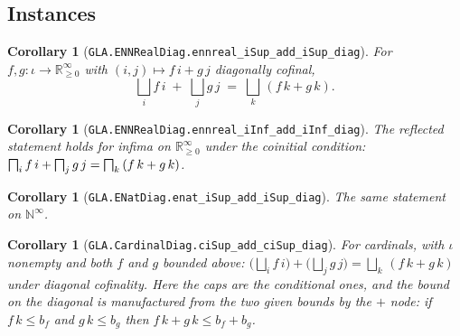 \documentclass[11pt,a4paper]{article}
\providecommand{\bigsqcap}{}
\renewcommand{\bigsqcap}{\mathop{\rotatebox[origin=c]{180}{$\bigsqcup$}}}
\newcommand{\lean}[1]{\texttt{\small #1}}
\newcommand{\Rzi}{\mathbb{R}_{\geq 0}^{\infty}}
\newcommand{\Ninf}{\mathbb{N}^{\infty}}
\theoremstyle{definition}
\theoremstyle{plain}
\newtheorem{corollary}[definition]{Corollary}
\theoremstyle{remark}
\begin{document}
\subsection{Instances}

\begin{corollary}[\lean{GLA.ENNRealDiag.ennreal\_iSup\_add\_iSup\_diag}]
For $f,g:\iota\to\Rzi$ with $(i,j)\mapsto f\,i+g\,j$ diagonally cofinal,
\[
\bigsqcup_i f\,i \;+\; \bigsqcup_j g\,j \;=\; \bigsqcup_k\,(f\,k+g\,k).
\]
\end{corollary}

\begin{corollary}[\lean{GLA.ENNRealDiag.ennreal\_iInf\_add\_iInf\_diag}]
The reflected statement holds for infima on $\Rzi$ under the coinitial
condition:
$\bigsqcap_i f\,i+\bigsqcap_j g\,j=\bigsqcap_k\,(f\,k+g\,k)$.
\end{corollary}

\begin{corollary}[\lean{GLA.ENatDiag.enat\_iSup\_add\_iSup\_diag}]
The same statement on $\Ninf$.
\end{corollary}

\begin{corollary}[\lean{GLA.CardinalDiag.ciSup\_add\_ciSup\_diag}]
For cardinals, with $\iota$ nonempty and both $f$ and $g$ bounded above:
$\bigl(\bigsqcup_i f\,i\bigr)+\bigl(\bigsqcup_j g\,j\bigr)
=\bigsqcup_k\,(f\,k+g\,k)$ under diagonal cofinality. Here the caps are the
conditional ones, and the bound on the diagonal is manufactured from the two
given bounds by the $+$ node: if $f\,k\le b_f$ and $g\,k\le b_g$ then
$f\,k+g\,k\le b_f+b_g$.
\end{corollary}

\begin{center}
\end{center}
\end{document}
